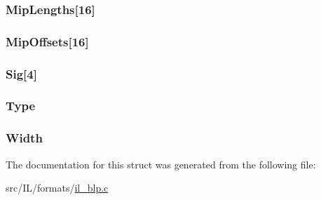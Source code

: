 \hypertarget{struct_b_l_p2_h_e_a_d_ab471413d9fd3a00d58f6e262e5672aea}{
\subsubsection[{Mip\-Lengths}]{ Mip\-Lengths\mbox{[}16\mbox{]}}}\label{struct_b_l_p2_h_e_a_d_ab471413d9fd3a00d58f6e262e5672aea}
\hypertarget{struct_b_l_p2_h_e_a_d_ae1442afe5a13d54073c68f22baca4fb3}{
\subsubsection[{Mip\-Offsets}]{ Mip\-Offsets\mbox{[}16\mbox{]}}}\label{struct_b_l_p2_h_e_a_d_ae1442afe5a13d54073c68f22baca4fb3}
\hypertarget{struct_b_l_p2_h_e_a_d_a44e23e3cb794abbb3bf035a7c72e0a14}{
\subsubsection[{Sig}]{ Sig\mbox{[}4\mbox{]}}}\label{struct_b_l_p2_h_e_a_d_a44e23e3cb794abbb3bf035a7c72e0a14}
\hypertarget{struct_b_l_p2_h_e_a_d_a0dfd5e410737b8035ece841196919127}{
\subsubsection[{Type}]{ Type}}\label{struct_b_l_p2_h_e_a_d_a0dfd5e410737b8035ece841196919127}
\hypertarget{struct_b_l_p2_h_e_a_d_a4146e7b2b0b4097e0e335f9b348392bf}{
\subsubsection[{Width}]{ Width}}\label{struct_b_l_p2_h_e_a_d_a4146e7b2b0b4097e0e335f9b348392bf}


The documentation for this struct was generated from the following file\-:\begin{DoxyCompactItemize}
\item 
src/\-I\-L/formats/\hyperlink{il__blp_8c}{il\-\_\-blp.\-c}\end{DoxyCompactItemize}
